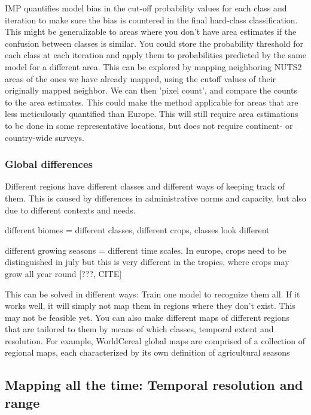         IMP quantifies model bias in the cut-off probability values for each class and iteration to make sure the bias is countered in the final hard-class classification. This might be generalizable to areas where you don't have area estimates if the confusion between classes is similar. You could store the probability threshold for each class at each iteration and apply them to probabilities predicted by the same model for a different area. This can be explored by mapping neighboring NUTS2 areas of the ones we have already mapped, using the cutoff values of their originally mapped neighbor. We can then 'pixel count', and compare the counts to the area estimates. This could make the method applicable for areas that are less meticulously quantified than Europe. This will still require area estimations to be done in some representative locations, but does not require continent- or country-wide surveys.
        
        \subsubsection{Global differences}

        Different regions have different classes and different ways of keeping track of them. This is caused by differences in administrative norms and capacity, but also due to different contexts and needs.

        different biomes = different classes, different crops, classes look different
        
        different growing seasons = different time scales. In europe, crops need to be distinguished in july \citep{esch2014differentiation,xu2021towards} but this is very different in the tropics, where crops may grow all year round [???, CITE]
        
        This can be solved in different ways: Train one model to recognize them all. If it works well, it will simply not map them in regions where they don't exist. This may not be feasible yet. You can also make different maps of different regions that are tailored to them by means of which classes, temporal extent and resolution. For example, WorldCereal global maps are comprised of a collection of regional maps, each characterized by its own definition of agricultural seasons \citep{tricht2023worldcereal}

    \subsection{Mapping all the time: Temporal resolution and range}

